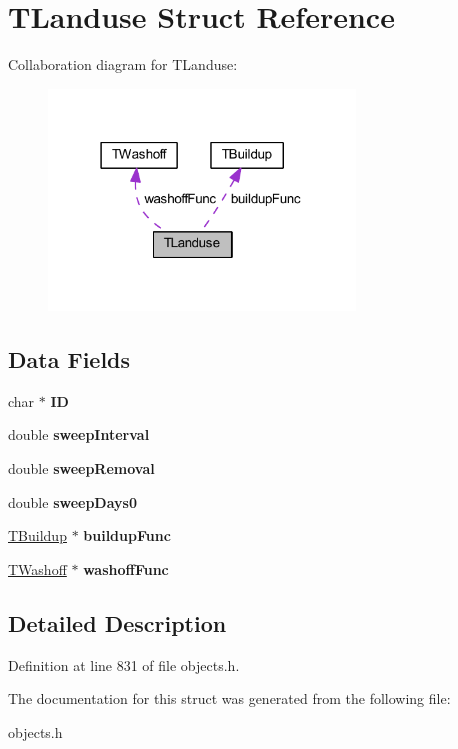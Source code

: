 \hypertarget{struct_t_landuse}{}\section{T\+Landuse Struct Reference}
\label{struct_t_landuse}


Collaboration diagram for T\+Landuse\+:
\nopagebreak
\begin{figure}[H]
\begin{center}
\leavevmode
\includegraphics[width=231pt]{d0/dd8/struct_t_landuse__coll__graph}
\end{center}
\end{figure}
\subsection*{Data Fields}
\begin{DoxyCompactItemize}
\item 
\mbox{\label{struct_t_landuse_a63756a4a33a8c806e584babb52907653}} 
char $\ast$ {\bfseries ID}
\item 
\mbox{\label{struct_t_landuse_ad431376785b3d48772cce64195608417}} 
double {\bfseries sweep\+Interval}
\item 
\mbox{\label{struct_t_landuse_a4c241e935e901c0ef297f9b9296b7a50}} 
double {\bfseries sweep\+Removal}
\item 
\mbox{\label{struct_t_landuse_ae99ffba5af0da163c96a55cca66abcbe}} 
double {\bfseries sweep\+Days0}
\item 
\mbox{\label{struct_t_landuse_a2c49bceb2a9e0de25baf796dccdb970f}} 
\hyperlink{struct_t_buildup}{T\+Buildup} $\ast$ {\bfseries buildup\+Func}
\item 
\mbox{\label{struct_t_landuse_a658c516da9c1b178158b9e0803ec089f}} 
\hyperlink{struct_t_washoff}{T\+Washoff} $\ast$ {\bfseries washoff\+Func}
\end{DoxyCompactItemize}


\subsection{Detailed Description}


Definition at line 831 of file objects.\+h.



The documentation for this struct was generated from the following file\+:\begin{DoxyCompactItemize}
\item 
objects.\+h\end{DoxyCompactItemize}
